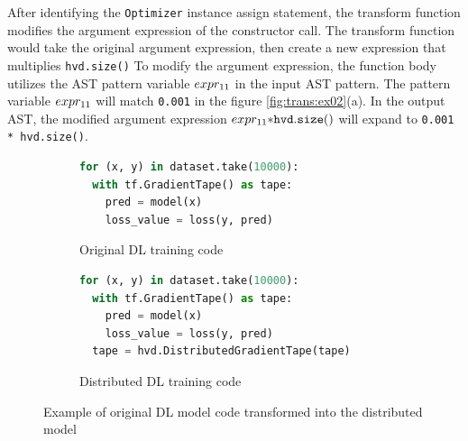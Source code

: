 After identifying the {\tt Optimizer} instance assign statement, 
the transform function modifies the argument expression of the
constructor call.
The transform function would take the original argument expression,
then create a new expression that multiplies {\tt hvd.size()}
To modify the argument expression, the function body utilizes the AST pattern
variable $expr_{11}$ in the input AST pattern.
The pattern variable $expr_{11}$ will match {\tt 0.001} in the figure
\ref{fig:trans:ex02}(a).
In the output AST, the modified argument expression 
$expr_{11} {\tt * hvd.size()}$ will expand to {\tt 0.001 * hvd.size()}.

\begin{figure}[ht!]
  \centering
  \begin{subfigure}[t]{0.48\textwidth}
    \begin{lstlisting}[language=Python]
for (x, y) in dataset.take(10000):
  with tf.GradientTape() as tape:
    pred = model(x)
    loss_value = loss(y, pred)\end{lstlisting} 
    \caption{Original DL training code}
  \end{subfigure}
  \hspace{5mm}
  \begin{subfigure}[t]{0.48\textwidth}
    \begin{lstlisting}[language=Python]
for (x, y) in dataset.take(10000):
  with tf.GradientTape() as tape:
    pred = model(x)
    loss_value = loss(y, pred) 
  tape = hvd.DistributedGradientTape(tape)\end{lstlisting}
    \caption{Distributed DL training code}
  \end{subfigure}
  \caption{Example of original DL model code transformed into the distributed model}
  \label{fig:trans:ex03}
\end{figure}

